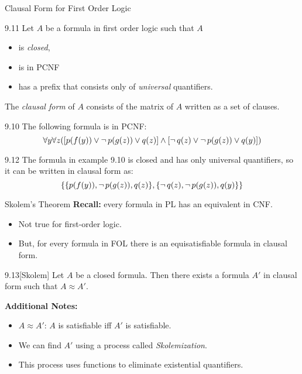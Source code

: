 \begin{wideslide}[bm=,toc=]{Clausal Form for First Order Logic}
\begin{defn}{9.11}
Let $A$ be a formula in first order logic such that $A$
\begin{itemize}
\item<2-> is \emph{closed},
\item<3-> is in PCNF 
\item<4-> has a prefix that consists only of \emph{universal} quantifiers. 
\end{itemize}
\pause[4]
The \emph{clausal form} of $A$ consists of the matrix of $A$ written as a set of clauses.
\end{defn}
\pause
\begin{ex}{9.10}
The following formula is in PCNF:
\[
  \forall y \forall z([p(f(y)) \lor \mathop{\neg} p (g(z)) \lor q(z)] \land [ \mathop{\neg} q(z)
      \lor \mathop{\neg} p (g(z)) \lor q(y)])
  \]
\end{ex}
\pause
\begin{ex}{9.12}
The formula in example 9.10 is closed and has only universal quantifiers, so it
can be written in clausal form as:
\[
   \{\{p(f(y)), \mathop{\neg} p(g(z)), q(z)\}, \{ \mathop{\neg} q(z), \mathop{\neg} p (g(z)), q(y)\}\}
  \]
\end{ex}
\end{wideslide}
\begin{wideslide}[bm=,toc=]{Skolem's Theorem}
{\bf Recall:} every formula in PL has an equivalent in CNF.
\begin{itemize}
\item<2-> Not true for first-order logic.
\item<3-> But, for every formula in FOL there is an equisatisfiable formula
in clausal form.
\end{itemize}
\pause[3]
\begin{thm}{9.13}[Skolem]
Let $A$ be a closed formula. Then there exists a formula $A'$ in clausal form
such that $A \approx A'$.
\end{thm}
\pause
\textbf{Additional Notes:}
\begin{itemize}
\item<6-> $A \approx A'$: $A$ is satisfiable iff $A'$ is satisfiable. 
\item<7-> We can find $A'$ using a process called \emph{Skolemization}. 
\item<8-> This process uses functions to eliminate existential quantifiers.
\end{itemize}
\end{wideslide}

